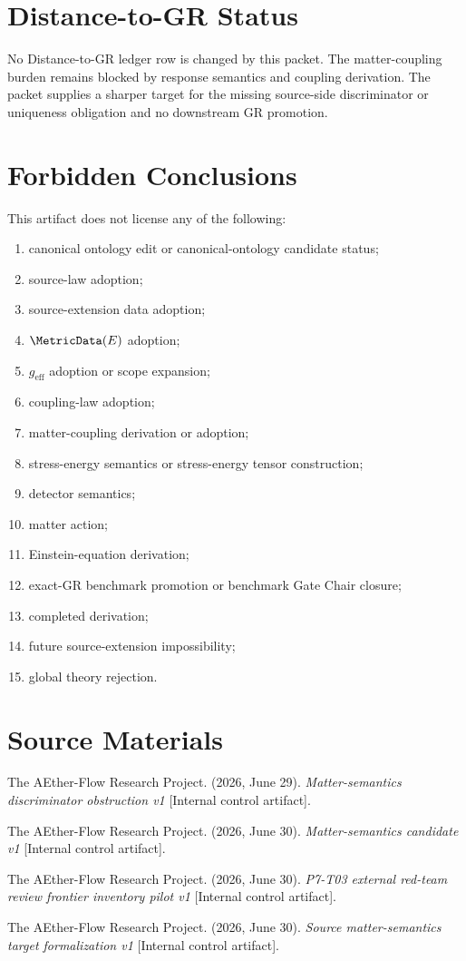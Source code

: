 \section{Distance-to-GR Status}

No Distance-to-GR ledger row is changed by this packet.  The
matter-coupling burden remains blocked by response semantics and coupling
derivation.  The packet supplies a sharper target for the missing
source-side discriminator or uniqueness obligation and no downstream GR
promotion.

\section{Forbidden Conclusions}

This artifact does not license any of the following:
\begin{enumerate}
  \item canonical ontology edit or canonical-ontology candidate status;
  \item source-law adoption;
  \item source-extension data adoption;
  \item \(\MetricData(E)\) adoption;
  \item \(g_{\mathrm{eff}}\) adoption or scope expansion;
  \item coupling-law adoption;
  \item matter-coupling derivation or adoption;
  \item stress-energy semantics or stress-energy tensor construction;
  \item detector semantics;
  \item matter action;
  \item Einstein-equation derivation;
  \item exact-GR benchmark promotion or benchmark Gate Chair closure;
  \item completed derivation;
  \item future source-extension impossibility;
  \item global theory rejection.
\end{enumerate}

\section{Source Materials}

The AEther-Flow Research Project. (2026, June 29). \emph{Matter-semantics
discriminator obstruction v1} [Internal control artifact].

The AEther-Flow Research Project. (2026, June 30). \emph{Matter-semantics
candidate v1} [Internal control artifact].

The AEther-Flow Research Project. (2026, June 30). \emph{P7-T03 external
red-team review frontier inventory pilot v1} [Internal control artifact].

The AEther-Flow Research Project. (2026, June 30). \emph{Source
matter-semantics target formalization v1} [Internal control artifact].
